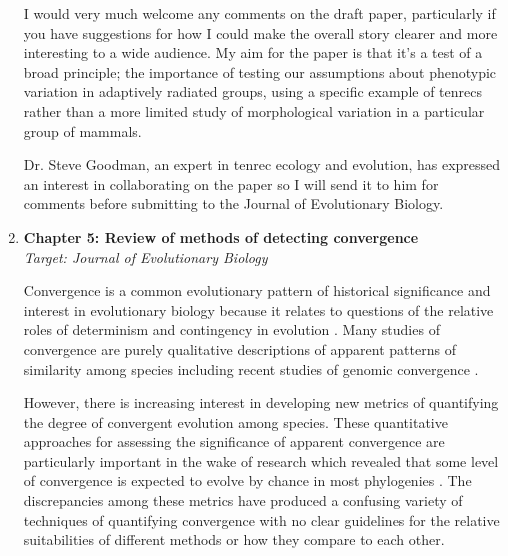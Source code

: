 \documentclass[12pt,a4paper]{article}
\begin{document}
\begin{enumerate}

I would very much welcome any comments on the draft paper, particularly if you have suggestions for how I could make the overall story clearer and more interesting to a wide audience. My aim for the paper is that it's a test of a broad principle; the importance of testing our assumptions about phenotypic variation in adaptively radiated groups, using a specific example of tenrecs rather than a more limited study of morphological variation in a particular group of mammals.

Dr. Steve Goodman, an expert in tenrec ecology and evolution, has expressed an interest in collaborating on the paper so I will send it to him for comments before submitting to the Journal of Evolutionary Biology.

\item \textbf{Chapter 5: Review of methods of detecting convergence}\\
\textit{Target: Journal of Evolutionary Biology}

Convergence is a common evolutionary pattern of historical significance and interest in evolutionary biology because it relates to questions of the relative roles of determinism and contingency in evolution \citep[c.f][]{Blount2008}. Many studies of convergence are purely qualitative descriptions of apparent patterns of similarity among species \citep[e.g.][]{Ben-Moshe2001, Leal2002, Fleischer2008} including recent studies of genomic convergence \citep{Jones2012, Parker2013}. 

However, there is increasing interest in developing new metrics of quantifying the degree of convergent evolution among species. These quantitative approaches for assessing the significance of apparent convergence are particularly important in the wake of research which revealed that some level of convergence is expected to evolve by chance in most phylogenies \citep{Stayton2008}.
The discrepancies among these metrics have produced a confusing variety of techniques of quantifying convergence with no clear guidelines for the relative suitabilities of different methods or how they compare to each other.
   


\end{enumerate}
\end{document}
